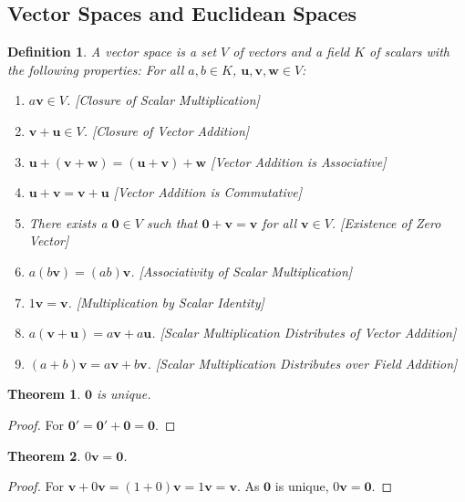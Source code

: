 \documentclass[oneside]{book}
\theoremstyle{mystyle}
\newtheorem{theorem}{Theorem}[section]
\newtheorem{definition}{Definition}[section]
\begin{document}
\subsection{Vector Spaces and Euclidean Spaces}
%
\begin{definition}
A vector space is a set $V$ of vectors and a field $K$ of scalars with the following properties: For all $a,b\in K$, $\mathbf{u,v,w}\in V$:
\begin{enumerate}
\item $a\mathbf{v} \in V$. \hfill [Closure of Scalar Multiplication]
\item $\mathbf{v}+\mathbf{u} \in V$. \hfill [Closure of Vector Addition]
\item $\mathbf{u}+(\mathbf{v}+\mathbf{w}) = (\mathbf{u}+\mathbf{v})+\mathbf{w}$ \hfill [Vector Addition is Associative]
\item $\mathbf{u}+\mathbf{v}=\mathbf{v}+\mathbf{u}$ \hfill [Vector Addition is Commutative]
\item There exists a $\mathbf{0}\in V$ such that $\mathbf{0}+\mathbf{v}=\mathbf{v}$ for all $\mathbf{v}\in V$. \hfill [Existence of Zero Vector]
\item $a(b\mathbf{v}) = (ab)\mathbf{v}$. \hfill [Associativity of Scalar Multiplication]
\item $1 \mathbf{v} = \mathbf{v}$. \hfill[Multiplication by Scalar Identity]
\item $a(\mathbf{v}+\mathbf{u}) = a\mathbf{v}+a\mathbf{u}$. \hfill [Scalar Multiplication Distributes of Vector Addition]
\item $(a+b)\mathbf{v}= a\mathbf{v}+b\mathbf{v}$. \hfill [Scalar Multiplication Distributes over Field Addition]
\end{enumerate}
\end{definition}

\begin{theorem}
$\mathbf{0}$ is unique.
\end{theorem}
\begin{proof}
For $\mathbf{0}'=\mathbf{0}'+\mathbf{0}=\mathbf{0}$.
\end{proof}

\begin{theorem}
$0\mathbf{v} = \mathbf{0}$.
\end{theorem}
\begin{proof}
For $\mathbf{v}+0\mathbf{v} = (1+0)\mathbf{v} = 1\mathbf{v} = \mathbf{v}$. As $\mathbf{0}$ is unique, $0\mathbf{v}=\mathbf{0}$.
\end{proof}
\end{document}
